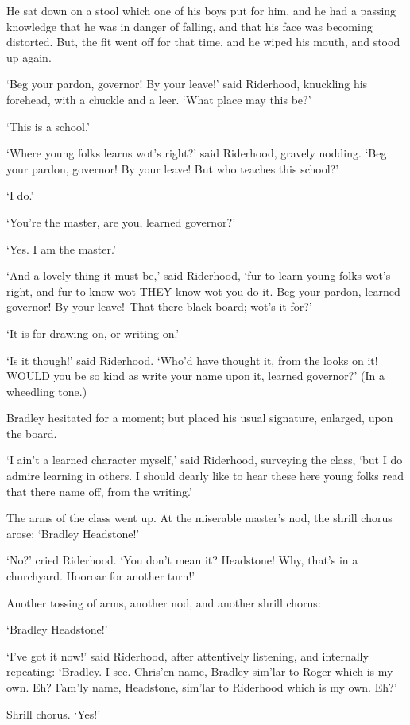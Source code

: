 He sat down on a stool which one of his boys put for him, and he had a
passing knowledge that he was in danger of falling, and that his face
was becoming distorted. But, the fit went off for that time, and he
wiped his mouth, and stood up again.

‘Beg your pardon, governor! By your leave!’ said Riderhood, knuckling
his forehead, with a chuckle and a leer. ‘What place may this be?’

‘This is a school.’

‘Where young folks learns wot’s right?’ said Riderhood, gravely nodding.
‘Beg your pardon, governor! By your leave! But who teaches this school?’

‘I do.’

‘You’re the master, are you, learned governor?’

‘Yes. I am the master.’

‘And a lovely thing it must be,’ said Riderhood, ‘fur to learn young
folks wot’s right, and fur to know wot THEY know wot you do it. Beg your
pardon, learned governor! By your leave!--That there black board; wot’s
it for?’

‘It is for drawing on, or writing on.’

‘Is it though!’ said Riderhood. ‘Who’d have thought it, from the
looks on it! WOULD you be so kind as write your name upon it, learned
governor?’ (In a wheedling tone.)

Bradley hesitated for a moment; but placed his usual signature,
enlarged, upon the board.

‘I ain’t a learned character myself,’ said Riderhood, surveying the
class, ‘but I do admire learning in others. I should dearly like to hear
these here young folks read that there name off, from the writing.’

The arms of the class went up. At the miserable master’s nod, the shrill
chorus arose: ‘Bradley Headstone!’

‘No?’ cried Riderhood. ‘You don’t mean it? Headstone! Why, that’s in a
churchyard. Hooroar for another turn!’

Another tossing of arms, another nod, and another shrill chorus:

‘Bradley Headstone!’

‘I’ve got it now!’ said Riderhood, after attentively listening, and
internally repeating: ‘Bradley. I see. Chris’en name, Bradley sim’lar to
Roger which is my own. Eh? Fam’ly name, Headstone, sim’lar to Riderhood
which is my own. Eh?’

Shrill chorus. ‘Yes!’

